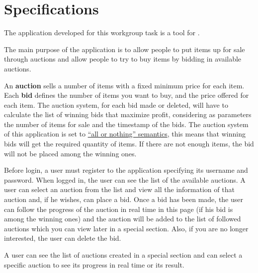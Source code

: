 \chapter{Specifications}\label{ch:specs}

The application developed for this workgroup task is a tool for .

The main purpose of the application is to allow people to put items up for sale
through auctions and allow people to try to buy items by bidding in available
auctions.

An \textbf{auction} sells a number of items with a fixed minimum price for each
item. Each \textbf{bid} defines the number of items you want to buy, and the
price offered for each item. The auction system, for each bid made or deleted,
will have to calculate the list of winning bids that maximize profit,
considering as parameters the number of items for sale and the timestamp of the
bids. The auction system of this application is set to \underline{``all or
nothing'' semantics}, this means that winning bids will get the required
quantity of items. If there are not enough items, the bid will not be placed
among the winning ones.

Before login, a user must register to the application specifying its username
and password. When logged in, the user can see the list of the available
auctions. A user can select an auction from the list and view all the
information of that auction and, if he wishes, can place a bid. Once a bid has
been made, the user can follow the progress of the auction in real time in this
page (if his bid is among the winning ones) and the auction will be added to the
list of followed auctions which you can view later in a special section. Also,
if you are no longer interested, the user can delete the bid.

A user can see the list of auctions created in a special section and can select
a specific auction to see its progress in real time or its result.
